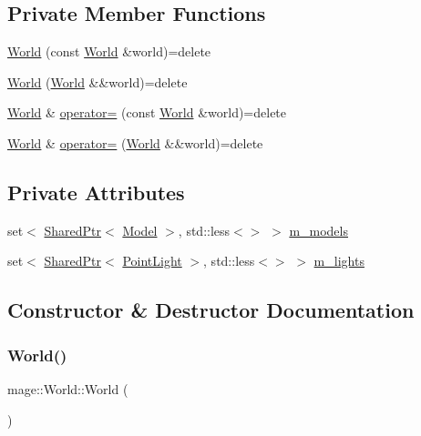 \subsection*{Private Member Functions}
\begin{DoxyCompactItemize}
\item 
\hyperlink{classmage_1_1_world_a28e20e33499cd57282cefa5ab0fda041}{World} (const \hyperlink{classmage_1_1_world}{World} \&world)=delete
\item 
\hyperlink{classmage_1_1_world_a29c5740a1fc3bfd7f05c6692257d17ff}{World} (\hyperlink{classmage_1_1_world}{World} \&\&world)=delete
\item 
\hyperlink{classmage_1_1_world}{World} \& \hyperlink{classmage_1_1_world_aa7074e3847c9fbe1466aa833f194eed0}{operator=} (const \hyperlink{classmage_1_1_world}{World} \&world)=delete
\item 
\hyperlink{classmage_1_1_world}{World} \& \hyperlink{classmage_1_1_world_a0440e945dfd0291174ce6dc33e5d8335}{operator=} (\hyperlink{classmage_1_1_world}{World} \&\&world)=delete
\end{DoxyCompactItemize}
\subsection*{Private Attributes}
\begin{DoxyCompactItemize}
\item 
set$<$ \hyperlink{namespacemage_a1e01ae66713838a7a67d30e44c67703e}{Shared\+Ptr}$<$ \hyperlink{classmage_1_1_model}{Model} $>$, std\+::less$<$$>$ $>$ \hyperlink{classmage_1_1_world_ad2c8da43f7cc24ec9f3108d24ff3c144}{m\+\_\+models}
\item 
set$<$ \hyperlink{namespacemage_a1e01ae66713838a7a67d30e44c67703e}{Shared\+Ptr}$<$ \hyperlink{classmage_1_1_point_light}{Point\+Light} $>$, std\+::less$<$$>$ $>$ \hyperlink{classmage_1_1_world_acb9bceb4598a9d572f026cb65d850de5}{m\+\_\+lights}
\end{DoxyCompactItemize}


\subsection{Constructor \& Destructor Documentation}
\hypertarget{classmage_1_1_world_a80582236a880812f9795a28ae5523cf7}{}\label{classmage_1_1_world_a80582236a880812f9795a28ae5523cf7} 
\subsubsection{\texorpdfstring{World()}{World()}\hspace{0.1cm}{\footnotesize\ttfamily [1/3]}}
{\footnotesize\ttfamily mage\+::\+World\+::\+World (\begin{DoxyParamCaption}{ }\end{DoxyParamCaption})\hspace{0.3cm}{\ttfamily [default]}}

